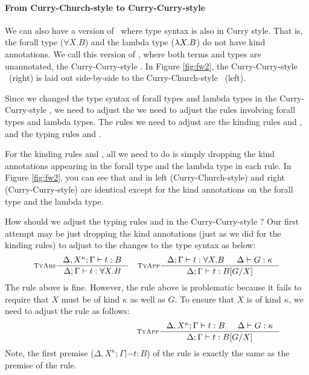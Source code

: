\paragraph{From Curry-Church-style to Curry-Curry-style}
We can also have a version of \Fw\ where type syntax is also in Curry style.
That is, the forall type ($\forall X.B$) and the lambda type ($\lambda X.B$)
do not have kind annotations. We call this version of \Fw, where both terms
and types are unannotated, the Curry-Curry-style \Fw.
In Figure \ref{fig:fw2}, the Curry-Curry-style \Fw\ (right) is laid out
side-by-side to the Curry-Church-style \Fw\ (left).

Since we changed the type syntax of forall types and lambda types in
the Curry-Curry-style \Fw, we need to adjust the we need to adjust the rules
involving forall types and lambda types. The rules we need to adjust are
the kinding rules  and , and
the typing rules  and .

For the kinding rules  and , all we need to do
is simply dropping the kind annotations appearing in the forall type and
the lambda type in each rule. In Figure \ref{fig:fw2}, you can see that
 and  in left (Curry-Church-style) and
right (Curry-Curry-style) are identical except for the kind annotations on
the forall type and the lambda type.

How should we adjust the typing rules  and 
in the Curry-Curry-style \Fw? Our first attempt may be just dropping
the kind annotations (just as we did for the kinding rules) to adjust to
the changes to the type syntax as below:
\begin{align*}
& \inference[\sc TyAbs]{\Delta,X^\kappa;\Gamma |- t : B}
		       {\Delta;\Gamma |- t : \forall X.B}
& \inference[\sc TyApp]{\Delta;\Gamma |- t : \forall X.B & \Delta |- G:\kappa}
		       {\Delta;\Gamma |- t : B[G/X]}
\end{align*}
The  rule above is fine. However, the  rule
above is problematic because it fails to require that $X$ must be of kind
$\kappa$ as well as $G$. To ensure that $X$ is of kind $\kappa$, we need to
adjust the  rule as follows:
\begin{align*}
& \phantom{ \inference[\sc TyAbs]{\Delta,X^\kappa;\Gamma |- t : B}
                                 {\Delta;\Gamma |- t : \forall X.B} }
& \inference[\sc TyApp]{\Delta,X^\kappa;\Gamma |- t : B & \Delta |- G:\kappa}
			{\Delta;\Gamma |- t : B[G/X]}
\end{align*}
Note, the first premise ($\Delta,X^\kappa;\Gamma |- t : B$) of
the  rule is exactly the same as the premise of
the  rule.

